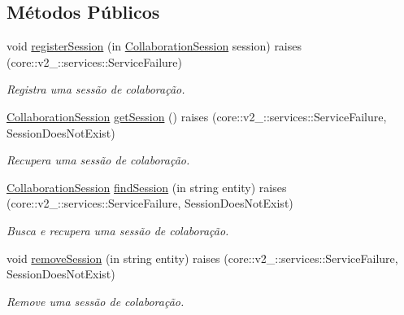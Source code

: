 \subsection*{\-Métodos \-Públicos}
\begin{DoxyCompactItemize}
\item 
void \hyperlink{interfacetecgraf_1_1openbus_1_1services_1_1collaboration_1_1v1__0_1_1SessionRegistry_a5e4aa6780744b50115f14e54d3ceae65}{register\-Session} (in \hyperlink{interfacetecgraf_1_1openbus_1_1services_1_1collaboration_1_1v1__0_1_1CollaborationSession}{\-Collaboration\-Session} session)  raises (core\-::v2\-\_\-::services\-::\-Service\-Failure)
\begin{DoxyCompactList}\small\item\em \-Registra uma sessão de colaboração. \end{DoxyCompactList}\item 
\hyperlink{interfacetecgraf_1_1openbus_1_1services_1_1collaboration_1_1v1__0_1_1CollaborationSession}{\-Collaboration\-Session} \hyperlink{interfacetecgraf_1_1openbus_1_1services_1_1collaboration_1_1v1__0_1_1SessionRegistry_ad8d05debbed6140bc3854e6b6a12877f}{get\-Session} ()  raises (core\-::v2\-\_\-::services\-::\-Service\-Failure, Session\-Does\-Not\-Exist)
\begin{DoxyCompactList}\small\item\em \-Recupera uma sessão de colaboração. \end{DoxyCompactList}\item 
\hyperlink{interfacetecgraf_1_1openbus_1_1services_1_1collaboration_1_1v1__0_1_1CollaborationSession}{\-Collaboration\-Session} \hyperlink{interfacetecgraf_1_1openbus_1_1services_1_1collaboration_1_1v1__0_1_1SessionRegistry_a8bb74b59832ccba9e3e9f789057852b9}{find\-Session} (in string entity)  raises (core\-::v2\-\_\-::services\-::\-Service\-Failure, Session\-Does\-Not\-Exist)
\begin{DoxyCompactList}\small\item\em \-Busca e recupera uma sessão de colaboração. \end{DoxyCompactList}\item 
void \hyperlink{interfacetecgraf_1_1openbus_1_1services_1_1collaboration_1_1v1__0_1_1SessionRegistry_acdaddeb84e734027915c7eba50543df8}{remove\-Session} (in string entity)  raises (core\-::v2\-\_\-::services\-::\-Service\-Failure, Session\-Does\-Not\-Exist)
\begin{DoxyCompactList}\small\item\em \-Remove uma sessão de colaboração. \end{DoxyCompactList}\end{DoxyCompactItemize}


